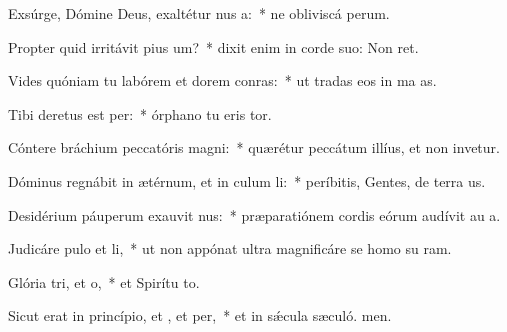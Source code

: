 \item Exsúrge, Dómine Deus, exaltétur nus a:~* ne obliviscá perum.
\item Propter quid irritávit pius um?~* dixit enim in corde suo: Non ret.
\item Vides quóniam tu labórem et dorem conras:~* ut tradas eos in ma as.
\item Tibi deretus est per:~* órphano tu eris tor.
\item Cóntere bráchium peccatóris  magni:~* quærétur peccátum illíus, et non invetur.
\item Dóminus regnábit in ætérnum, et in culum li:~* períbitis, Gentes, de terra us.
\item Desidérium páuperum exauvit nus:~* præparatiónem cordis eórum audívit au a.
\item Judicáre pulo et li,~* ut non appónat ultra magnificáre se homo su ram.
\item Glória tri, et o,~* et Spirítu to.
\item Sicut erat in princípio, et , et per,~* et in sǽcula sæculó. men.
